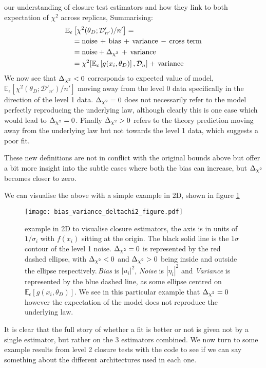 our understanding of closure test estimators and how they link to both
expectation of $\chi^2$ across replicas, Summarising:
%
\begin{align}
    &\mathbb{E}_{\epsilon}\left[\chi^2(\theta_D; \mathcal{D}'_{n'})/n'\right] = \nonumber \\
    & \quad = \mathrm{noise} \, + \, \mathrm{bias} \, + \, \mathrm{variance} \, - \, \mathrm{cross \ term} \\
    & \quad = \mathrm{noise} + \Delta_{\chi^{2}} \, + \, \mathrm{variance} \\
    & \quad = \chi^2[\mathbb{E}_{\epsilon}\left[g(x_i,\theta_D)\right], \mathcal{D}_n] + \, \mathrm{variance}
\end{align}
%
We now see that $\Delta_{\chi^{2}} < 0$
corresponds to expected value of model,
$\mathbb{E}_{\epsilon}\left[\chi^2(\theta_D; \mathcal{D}'_{n'})/n'\right]$
moving away from the level 0 data specifically in the direction of the level 1
data. $\Delta_{\chi^{2}} = 0$ does not necessarily refer to the model perfectly reproducing the underlying law,
although clearly this is one case which would lead to $\Delta_{\chi^{2}}=0$.
Finally $\Delta_{\chi^{2}} > 0$ refers to the theory prediction moving
away from the underlying law but not towards the level 1 data, which suggests a
poor fit.

These new definitions are not in conflict with the original bounds above but
offer a bit more insight into the subtle cases where both the bias can increase,
but $\Delta_{\chi^{2}}$ becomes closer to zero.

We can visualise the above with a simple example in 2D, shown in figure
\ref{fig:vectorexample}
\newpage
%
\begin{figure}[!h]
    \centering
    \texttt{[image: bias\_variance\_deltachi2\_figure.pdf]}
    \caption{example in 2D to visualise closure estimators, the axis
    is in units of $1/\sigma_{i}$ with $f(x_i)$ sitting at the origin.
    The black solid line is the $1 \sigma$ contour of the level 1 noise.
    $\Delta_{\chi^{2}}=0$ is represented by the red dashed
    ellipse, with $\Delta_{\chi^{2}} < 0$ and $\Delta_{\chi^{2}} > 0$ being inside and outside the ellipse
    respectively.\,{\em Bias} is $|u_i|^2$, {\em Noise} is $|\eta_i|^2$ and {\em Variance} is
    represented by the blue dashed line, as some ellipse centred on
    $\mathbb{E}_{\epsilon}\left[ g(x_i, \theta_D)\right]$. We see in this
    particular example that $\Delta_{\chi^{2}}=0$ however the expectation of the model does
    not reproduce the underlying law.}
    \label{fig:vectorexample}
\end{figure}
%

It is clear that the full story of whether a fit is better or not is given not
by a single estimator, but rather on the 3 estimators combined. We now turn to
some example results from level 2 closure tests with the \nfit code to see if we
can say something about the different architectures used in each one.

